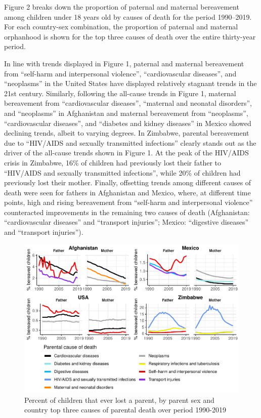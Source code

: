 \documentclass[
  11pt,
  letterpaper,
]{article}
\begin{document}
Figure 2 breaks down the proportion of paternal and maternal bereavement among children under 18 years old by causes of death for the period 1990--2019. For each country-sex combination, the proportion of paternal and maternal orphanhood is shown for the top three causes of death over the entire thirty-year period.

In line with trends displayed in Figure 1, paternal and maternal bereavement from ``self-harm and interpersonal violence'', ``cardiovascular diseases'', and ``neoplasms'' in the United States have displayed relatively stagnant trends in the 21st century. Similarly, following the all-cause trends in Figure 1, maternal bereavement from ``cardiovascular diseases'', ``maternal and neonatal disorders'', and ``neoplasms'' in Afghanistan and maternal bereavement from ``neoplasms'', ``cardiovascular diseases'', and ``diabetes and kidney diseases'' in Mexico showed declining trends, albeit to varying degrees. In Zimbabwe, parental bereavement due to ``HIV/AIDS and sexually transmitted infections'' clearly stands out as the driver of the all-cause trends shown in Figure 1. At the peak of the HIV/AIDS crisis in Zimbabwe, 16\% of children had previously lost their father to ``HIV/AIDS and sexually transmitted infections'', while 20\% of children had previously lost their mother. Finally, offsetting trends among different causes of death were seen for fathers in Afghanistan and Mexico, where, at different time points, high and rising bereavement from ``self-harm and interpersonal violence'' counteracted improvements in the remaining two causes of death (Afghanistan: ``cardiovascular diseases'' and ``transport injuries''; Mexico: ``digestive diseases'' and ``transport injuries'').

\begin{figure}
\centering
\includegraphics{parental_loss_global_paa_ext_abstract_files/figure-latex/perc-ber-top-1.pdf}
\caption{\label{fig:perc-ber-top}Percent of children that ever lost a parent, by parent sex and country top three causes of parental death over period 1990-2019}
\end{figure}
\end{document}
